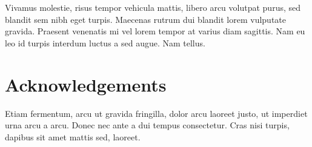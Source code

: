 \documentclass[a0,portrait]{a0poster}
\begin{document}
\begin{multicols}{2}
Vivamus molestie, risus tempor vehicula mattis, libero arcu volutpat purus, sed blandit sem nibh eget turpis. Maecenas rutrum dui blandit lorem vulputate gravida. Praesent venenatis mi vel lorem tempor at varius diam sagittis. Nam eu leo id turpis interdum luctus a sed augue. Nam tellus.


\nocite{*} %


\section*{Acknowledgements}

Etiam fermentum, arcu ut gravida fringilla, dolor arcu laoreet justo, ut imperdiet urna arcu a arcu. Donec nec ante a dui tempus consectetur. Cras nisi turpis, dapibus sit amet mattis sed, laoreet.


\end{multicols}

\columnseprule=0pt
\end{document}
